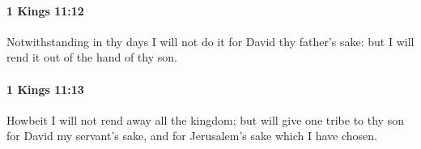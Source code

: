 		\paragraph{1 Kings 11:12} %
			\label{1KINGS-11-12}

			Notwithstanding in thy days I will not do it for David thy father’s sake: but I will rend it out of the hand of thy son.


		\paragraph{1 Kings 11:13} %
			\label{1KINGS-11-13}

			Howbeit I will not rend away all the kingdom; but will give one tribe to thy son for David my servant’s sake, and for Jerusalem’s sake which I have chosen.


